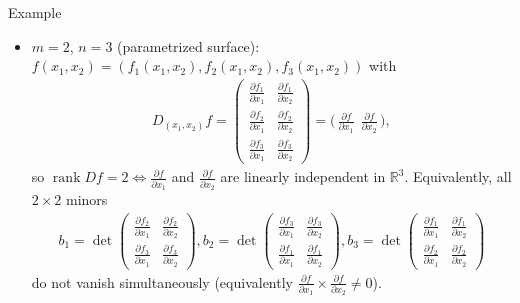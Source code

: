 \begin{frame}{Example}
\begin{itemize}
\item $m=2$, $n=3$ (parametrized surface):
$f(x_1,x_2)=(f_1(x_1,x_2),f_2(x_1,x_2),f_3(x_1,x_2))$ with
\begin{align*}
D_{(x_1,x_2)} f
=\begin{pmatrix}
\frac{\partial f_1}{\partial x_1} & \frac{\partial f_1}{\partial x_2} \\[4pt]
\frac{\partial f_2}{\partial x_1} & \frac{\partial f_2}{\partial x_2} \\[4pt]
\frac{\partial f_3}{\partial x_1} & \frac{\partial f_3}{\partial x_2}
\end{pmatrix}
=\big(\,\frac{\partial f}{\partial x_1}\ \ \frac{\partial f}{\partial x_2}\,\big),
\end{align*}
so $\operatorname{rank} D f=2 \Leftrightarrow \frac{\partial f}{\partial x_1}$
and $\frac{\partial f}{\partial x_2}$ are linearly independent in $\mathbb{R}^3$.
Equivalently, all $2\times 2$ minors
\begin{align*}
b_1=\det\!
\begin{pmatrix}
\frac{\partial f_2}{\partial x_1} & \frac{\partial f_2}{\partial x_2} \\[4pt] 
\frac{\partial f_3}{\partial x_1} & \frac{\partial f_3}{\partial x_2}
\end{pmatrix},
b_2=\det\!
\begin{pmatrix}
\frac{\partial f_3}{\partial x_1} & \frac{\partial f_3}{\partial x_2} \\[4pt] 
\frac{\partial f_1}{\partial x_1} & \frac{\partial f_1}{\partial x_2}
\end{pmatrix},
b_3=\det\!
\begin{pmatrix}
\frac{\partial f_1}{\partial x_1} & \frac{\partial f_1}{\partial x_2} \\[4pt]
\frac{\partial f_2}{\partial x_1} & \frac{\partial f_2}{\partial x_2}
\end{pmatrix}
\end{align*}
do not vanish simultaneously (equivalently
$\frac{\partial f}{\partial x_1} \times \frac{\partial f}{\partial x_2} \neq 0$).
\end{itemize}
\end{frame}

